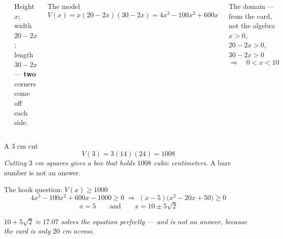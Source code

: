 \documentclass[aspectratio=169, 11pt]{beamer}
\begin{document}
\begin{frame}[t, plain]

  \begin{columns}[T]
      \begin{center}
      \end{center}

      Height \(x\); width \(20 - 2x\); length \(30 - 2x\) --- \textbf{two}
      corners come off each side.

      \medskip
      \begin{block}{The model}
        \[ V(x) = x(20-2x)(30-2x) = 4x^3 - 100x^2 + 600x \]
      \end{block}

      \medskip
      \begin{block}{The domain --- from the card, not the algebra}
        \(x > 0\), \quad \(20 - 2x > 0\), \quad \(30 - 2x > 0\)
        \[ \Longrightarrow \quad 0 < x < 10 \]
      \end{block}
  \end{columns}
\end{frame}

\begin{frame}[t, plain]

  \begin{block}{A \(3\) cm cut}
    \[ V(3) = 3(14)(24) = 1008 \]
    \textit{Cutting \(3\) cm squares gives a box that holds \(1008\) cubic
    centimeters.} A bare number is not an answer.
  \end{block}

  \bigskip
  \begin{block}{The hook question: \(V(x) \ge 1000\)}
    \[ 4x^3 - 100x^2 + 600x - 1000 \ge 0
       \;\Longrightarrow\;
       (x-5)\big(x^2 - 20x + 50\big) \ge 0 \]
    \[ x = 5 \qquad\text{and}\qquad x = 10 \pm 5\sqrt{2} \]
  \end{block}

  \bigskip
  \textit{\(10 + 5\sqrt{2} \approx 17.07\) solves the equation perfectly --- and
  is not an answer, because the card is only \(20\) cm across.}
\end{frame}
\end{document}

